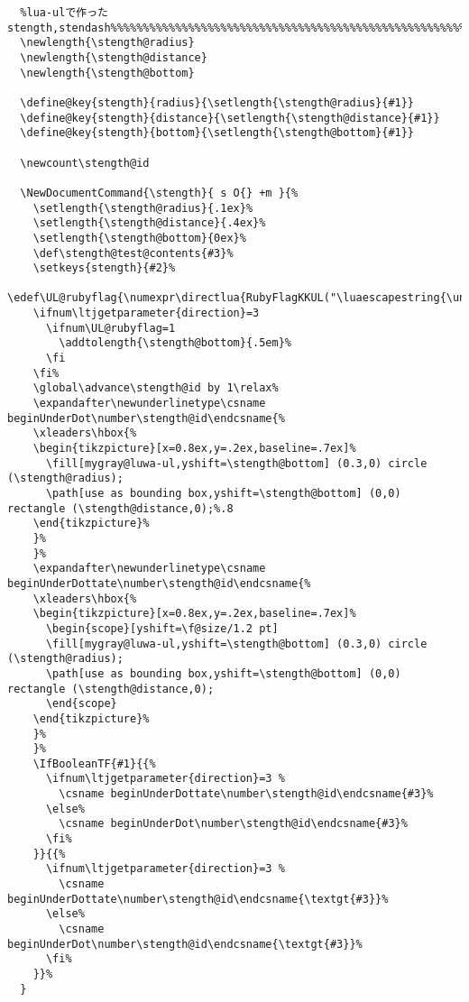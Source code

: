 \documentclass[luatex,fontsize=8pt,paper=b5,twoside]{jlreq}%
\begin{document}
\begin{lstlisting}
  %lua-ulで作ったstength,stendash%%%%%%%%%%%%%%%%%%%%%%%%%%%%%%%%%%%%%%%%%%%%%%%%%%%%%%%%%%
  \newlength{\stength@radius}
  \newlength{\stength@distance}
  \newlength{\stength@bottom}

  \define@key{stength}{radius}{\setlength{\stength@radius}{#1}}
  \define@key{stength}{distance}{\setlength{\stength@distance}{#1}}
  \define@key{stength}{bottom}{\setlength{\stength@bottom}{#1}}

  \newcount\stength@id  

  \NewDocumentCommand{\stength}{ s O{} +m }{%
    \setlength{\stength@radius}{.1ex}%
    \setlength{\stength@distance}{.4ex}%
    \setlength{\stength@bottom}{0ex}%
    \def\stength@test@contents{#3}%
    \setkeys{stength}{#2}%
    \edef\UL@rubyflag{\numexpr\directlua{RubyFlagKKUL("\luaescapestring{\unexpanded\expandafter{\stength@test@contents}}")}\relax}%
    \ifnum\ltjgetparameter{direction}=3
      \ifnum\UL@rubyflag=1
        \addtolength{\stength@bottom}{.5em}%
      \fi
    \fi%
    \global\advance\stength@id by 1\relax%
    \expandafter\newunderlinetype\csname beginUnderDot\number\stength@id\endcsname{%
    \xleaders\hbox{%
    \begin{tikzpicture}[x=0.8ex,y=.2ex,baseline=.7ex]%
      \fill[mygray@luwa-ul,yshift=\stength@bottom] (0.3,0) circle (\stength@radius);
      \path[use as bounding box,yshift=\stength@bottom] (0,0) rectangle (\stength@distance,0);%.8
    \end{tikzpicture}%
    }%
    }%
    \expandafter\newunderlinetype\csname beginUnderDottate\number\stength@id\endcsname{%
    \xleaders\hbox{%
    \begin{tikzpicture}[x=0.8ex,y=.2ex,baseline=.7ex]%
      \begin{scope}[yshift=\f@size/1.2 pt]
      \fill[mygray@luwa-ul,yshift=\stength@bottom] (0.3,0) circle (\stength@radius);
      \path[use as bounding box,yshift=\stength@bottom] (0,0) rectangle (\stength@distance,0);
      \end{scope}
    \end{tikzpicture}%
    }%
    }%
    \IfBooleanTF{#1}{{%
      \ifnum\ltjgetparameter{direction}=3 %
        \csname beginUnderDottate\number\stength@id\endcsname{#3}%
      \else%
        \csname beginUnderDot\number\stength@id\endcsname{#3}%
      \fi%
    }}{{%
      \ifnum\ltjgetparameter{direction}=3 %
        \csname beginUnderDottate\number\stength@id\endcsname{\textgt{#3}}%
      \else%
        \csname beginUnderDot\number\stength@id\endcsname{\textgt{#3}}%
      \fi%
    }}%
  }



\end{lstlisting}
\end{document}
